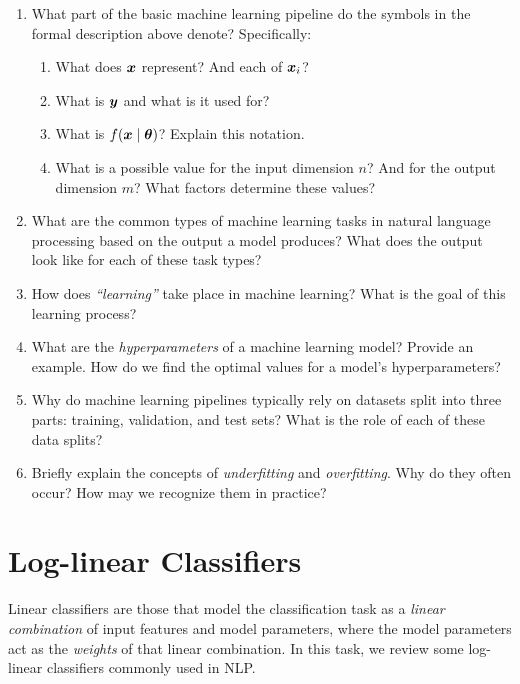 \documentclass[11pt,a4paper]{article}
\begin{document}
\begin{enumerate}[label=(\alph*)]
    \item What part of the basic machine learning pipeline do the symbols in the
          formal description above denote?
          Specifically:
          \begin{enumerate}[label=(\roman*)]
              \item What does ${\boldsymbol{x}}$ represent? And each of ${\boldsymbol{x}}_i$?
              \item What is ${\boldsymbol{y}}$ and what is it used for?
              \item What is $f({\boldsymbol{x}}\mid{\boldsymbol{\theta}})$? Explain this notation.
              \item What is a possible value for the input dimension $n$?
                    And for the output dimension $m$? What factors determine
                    these values?
          \end{enumerate}
    \item What are the common types of machine learning tasks in natural
          language processing based on the output a model produces?
          What does the output look like for each of these task types?
    \item How does \emph{``learning''} take place in machine learning? What is
          the goal of this learning process?
    \item What are the \textit{hyperparameters} of a machine learning model?
          Provide an example.
          How do we find the optimal values for a model's hyperparameters?
    \item Why do machine learning pipelines typically rely on datasets split
          into three parts: training, validation, and test sets? What is the
          role of each of these data splits?
    \item Briefly explain the concepts of \emph{underfitting} and
          \emph{overfitting}. Why do they often occur? How may we recognize them
          in practice?
\end{enumerate}

\section{Log-linear Classifiers}

Linear classifiers are those that model the classification task as a
\emph{linear combination} of input features and model parameters, where the
model parameters act as the \emph{weights} of that linear combination.
In this task, we review some log-linear classifiers commonly used in NLP.
\end{document}
